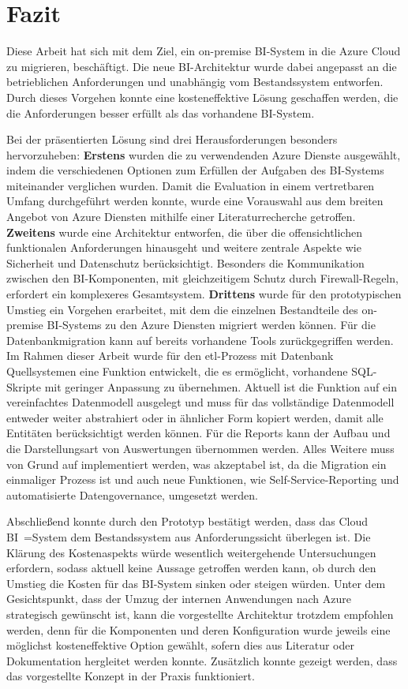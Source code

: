 \chapter{Fazit} \label{ch:zusammenfassung}
Diese Arbeit hat sich mit dem Ziel, ein on-premise BI-System in die Azure Cloud zu migrieren, beschäftigt. Die neue BI-Architektur wurde dabei angepasst an die betrieblichen Anforderungen und unabhängig vom Bestandssystem entworfen. Durch dieses Vorgehen konnte eine kosteneffektive Lösung geschaffen werden, die die Anforderungen besser erfüllt als das vorhandene BI-System.

Bei der präsentierten Lösung sind drei Herausforderungen besonders hervorzuheben: \textbf{Erstens} wurden die zu verwendenden Azure Dienste ausgewählt, indem die verschiedenen Optionen zum Erfüllen der Aufgaben des BI-Systems miteinander verglichen wurden. Damit die Evaluation in einem vertretbaren Umfang durchgeführt werden konnte, wurde eine Vorauswahl aus dem breiten Angebot von Azure Diensten mithilfe einer Literaturrecherche getroffen. \textbf{Zweitens} wurde eine Architektur entworfen, die über die offensichtlichen funktionalen Anforderungen hinausgeht und weitere zentrale Aspekte wie Sicherheit und Datenschutz berücksichtigt. Besonders die Kommunikation zwischen den BI-Komponenten, mit gleichzeitigem Schutz durch Firewall-Regeln, erfordert ein komplexeres Gesamtsystem. \textbf{Drittens} wurde für den prototypischen Umstieg ein Vorgehen erarbeitet, mit dem die einzelnen Bestandteile des on-premise BI-Systems zu den Azure Diensten migriert werden können. Für die Datenbankmigration kann auf bereits vorhandene Tools zurückgegriffen werden. Im Rahmen dieser Arbeit wurde für den \ac{etl}-Prozess mit Datenbank Quellsystemen eine Funktion entwickelt, die es ermöglicht, vorhandene SQL-Skripte mit geringer Anpassung zu übernehmen. Aktuell ist die Funktion auf ein vereinfachtes Datenmodell ausgelegt und muss für das vollständige Datenmodell entweder weiter abstrahiert oder in ähnlicher Form kopiert werden, damit alle Entitäten berücksichtigt werden können. Für die Reports kann der Aufbau und die Darstellungsart von Auswertungen übernommen werden. Alles Weitere muss von Grund auf implementiert werden, was akzeptabel ist, da die Migration ein einmaliger Prozess ist und auch neue Funktionen, wie Self-Service-Reporting und automatisierte Datengovernance, umgesetzt werden.

Abschließend konnte durch den Prototyp bestätigt werden, dass das Cloud BI~=System dem Bestandssystem aus Anforderungssicht überlegen ist. Die Klärung des Kostenaspekts würde wesentlich weitergehende Untersuchungen erfordern, sodass aktuell keine Aussage getroffen werden kann, ob durch den Umstieg die Kosten für das BI-System sinken oder steigen würden. Unter dem Gesichtspunkt, dass der Umzug der internen Anwendungen nach Azure strategisch gewünscht ist, kann die vorgestellte Architektur trotzdem empfohlen werden, denn für die Komponenten und deren Konfiguration wurde jeweils eine möglichst kosteneffektive Option gewählt, sofern dies aus Literatur oder Dokumentation hergleitet werden konnte. Zusätzlich konnte gezeigt werden, dass das vorgestellte Konzept in der Praxis funktioniert.

